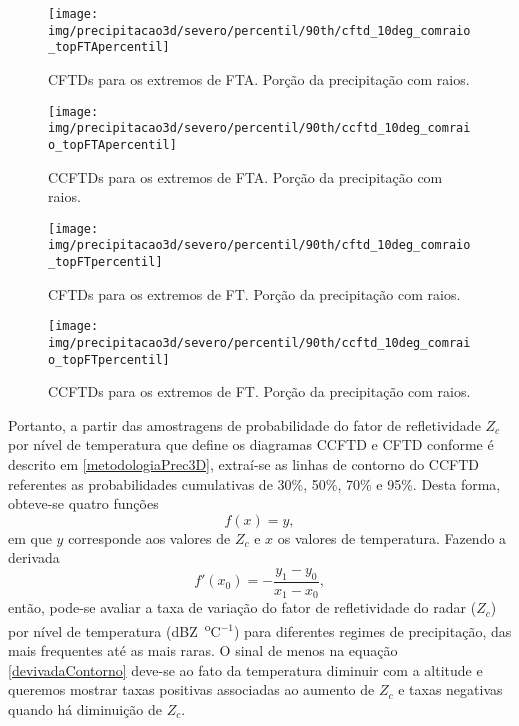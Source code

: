 \begin{sidewaysfigure}%
\centering
\texttt{[image: img/precipitacao3d/severo/percentil/90th/cftd\_10deg\_comraio\_topFTApercentil]}
\caption{CFTDs para os extremos de FTA. Porção da precipitação com raios.}
\label{cftd_fta_com}
\end{sidewaysfigure} 

\begin{sidewaysfigure}%
\centering
\texttt{[image: img/precipitacao3d/severo/percentil/90th/ccftd\_10deg\_comraio\_topFTApercentil]}
\caption{CCFTDs para os extremos de FTA. Porção da precipitação com raios.}
\label{ccftd_fta_com}
\end{sidewaysfigure} 

\begin{sidewaysfigure}%
\centering
\texttt{[image: img/precipitacao3d/severo/percentil/90th/cftd\_10deg\_comraio\_topFTpercentil]}
\caption{CFTDs para os extremos de FT. Porção da precipitação com raios.}
\label{cftd_ft_com}
\end{sidewaysfigure} 

\begin{sidewaysfigure}%
\centering
\texttt{[image: img/precipitacao3d/severo/percentil/90th/ccftd\_10deg\_comraio\_topFTpercentil]}
\caption{CCFTDs para os extremos de FT. Porção da precipitação com raios.}
\label{ccftd_ft_com}
\end{sidewaysfigure} 

Portanto, a partir das amostragens de probabilidade do fator de refletividade $Z_c$ por nível de temperatura que define os diagramas CCFTD e CFTD conforme é descrito em \ref{metodologiaPrec3D},  extraí-se as linhas de contorno do CCFTD referentes as probabilidades cumulativas de 30\%, 50\%, 70\% e 95\%. Desta forma, obteve-se quatro funções 
\begin{equation}
f(x)=y ,
\end{equation} 
em que $y$ corresponde aos valores de $Z_c$ e $x$ os valores de temperatura. Fazendo a derivada 
\begin{equation}
f'(x_0)= - \dfrac{y_1 - y_0}{x_1 - x_0},
\label{devivadaContorno}
\end{equation}
então, pode-se avaliar a taxa de variação do fator de refletividade do radar ($Z_c$) por nível de temperatura (dBZ~\textsuperscript{o}C$^{-1}$) para diferentes regimes de precipitação, das mais frequentes até as mais raras. O sinal de menos na equação \ref{devivadaContorno} deve-se ao fato da temperatura diminuir com a altitude e queremos mostrar taxas positivas associadas ao aumento de $Z_c$ e taxas negativas quando há diminuição de $Z_c$.

